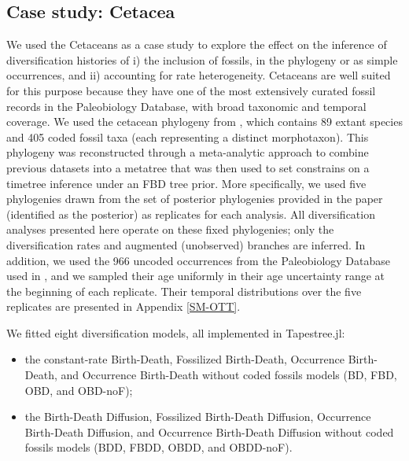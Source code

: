 \documentclass[oupdraft]{sysbio}
\newcommand{\revised}[1]{{\color{blue} #1}}
\begin{document}
\subsection{Case study: Cetacea}

We used the Cetaceans as a case study to explore the effect on the inference of diversification histories of i) the inclusion of fossils, in the phylogeny or as simple occurrences, and ii) accounting for rate heterogeneity. \revised{Cetaceans are well suited for this purpose because they have one of the most extensively curated fossil records in the Paleobiology Database, with broad taxonomic and temporal coverage.} We used the cetacean phylogeny from \citet{lloyd_total-group_2021}, which contains 89 extant species and 405 \revised{coded fossil taxa (each representing a distinct morphotaxon)}. This phylogeny was reconstructed through a meta-analytic approach to combine previous datasets into a metatree that was then used to set constrains on a timetree inference under an FBD tree prior. More specifically, we used five phylogenies drawn from the set of posterior phylogenies provided in the paper (identified as the  posterior) as replicates for each analysis. \revised{All diversification analyses presented here operate on these fixed phylogenies; only the diversification rates and augmented (unobserved) branches are inferred.} In addition, we used the 966 \revised{uncoded} occurrences from the Paleobiology Database \revised{\citep{uhen_paleobiology_2023, mcclennen_paleobiology_2024}} used in \citet{andreoletti_occurrence_2022}, and we sampled their age uniformly in their age uncertainty range at the beginning of each replicate. Their temporal distributions over the five replicates are presented in Appendix \ref{SM-OTT}.

We fitted eight diversification models, all implemented in Tapestree.jl:
\begin{itemize}
    \item the constant-rate Birth-Death, Fossilized Birth-Death, Occurrence Birth-Death, and Occurrence Birth-Death without \revised{coded} fossils models (BD, FBD, OBD, and OBD-noF);
    \item the Birth-Death Diffusion, Fossilized Birth-Death Diffusion, Occurrence Birth-Death Diffusion, and Occurrence Birth-Death Diffusion without \revised{coded} fossils models (BDD, FBDD, OBDD, and OBDD-noF).
\end{itemize}
\end{document}
